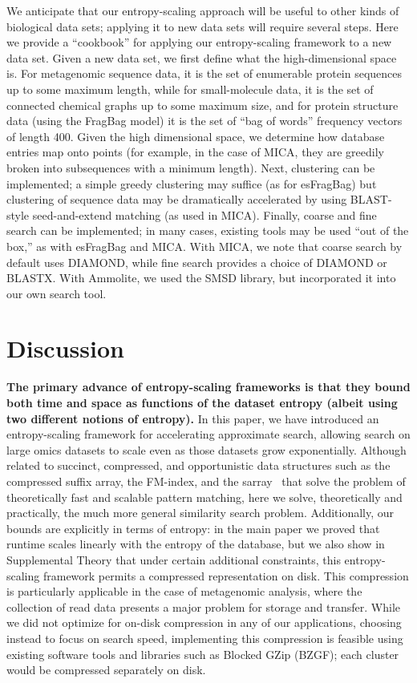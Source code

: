 \documentclass[review,preprint,12pt]{elsarticle}
\renewcommand{\cite}{\citep} %
\theoremstyle{definition}
\theoremstyle{remark}
\numberwithin{equation}{section}
\begin{document}
We anticipate that our entropy-scaling approach will be useful to other kinds of
biological data sets; applying it to new data sets will require several steps.
Here we provide a ``cookbook'' for applying our entropy-scaling framework to
a new data set.
Given a new data set, we first define what the high-dimensional space is.
For metagenomic sequence data, it is the set of enumerable protein sequences up
to some maximum length, while for small-molecule data, it is the set of
connected chemical graphs up to some maximum size, and for protein structure
data (using the FragBag model) it is the set of ``bag of words'' frequency 
vectors of length 400.
Given the high dimensional space, we determine how database entries map
onto points (for example, in the case of MICA, they are greedily broken into subsequences with a minimum length).
Next, clustering can be implemented; a simple greedy clustering may suffice 
(as for esFragBag) but clustering of sequence data may be dramatically 
accelerated by using BLAST-style seed-and-extend matching (as used in MICA).
Finally, coarse and fine search can be implemented; in many cases, existing
tools may be used ``out of the box,'' as with esFragBag and MICA.
With MICA, we note that coarse search by default uses
DIAMOND, while fine search provides a choice of DIAMOND or BLASTX.
With Ammolite, we used the SMSD library, but incorporated it into our own search
tool.

\section{Discussion}

\textbf{The primary advance of entropy-scaling frameworks is that they bound both time and space as functions of the dataset entropy (albeit using two different notions of entropy).}
In this paper, we have introduced an entropy-scaling framework for accelerating approximate search,
allowing search on large omics datasets to scale even as those datasets grow exponentially.
Although related to succinct, compressed, and opportunistic data structures such as the compressed suffix array, the FM-index, and the sarray~\cite{grossi2005compressed, ferragina2000opportunistic,conway2011succinct} that solve the problem of 
theoretically fast and scalable pattern matching,
here we solve, theoretically and practically, the much more general similarity 
search problem.
Additionally, our bounds are explicitly in terms of entropy: in the main paper we proved that runtime scales linearly with the entropy of the 
database, but we also show in Supplemental Theory that under certain additional constraints, this entropy-scaling framework permits a compressed 
representation on disk.
This compression is particularly applicable in the case of metagenomic analysis, where the collection of 
read data presents a major problem for storage and transfer.
While we did not optimize for on-disk compression in any of our applications, 
choosing instead to focus on search speed, implementing this compression is 
feasible using existing software tools and libraries such as Blocked GZip 
(BZGF); each cluster would be compressed separately on disk.
\end{document}
